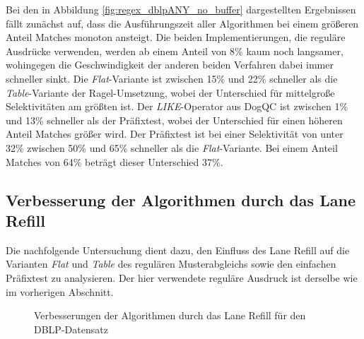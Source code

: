 Bei den in Abbildung \ref{fig:regex_dblpANY_no_buffer} dargestellten Ergebnissen fällt zunächst auf, dass die Ausführungszeit aller Algorithmen bei einem größeren Anteil Matches monoton ansteigt.
Die beiden Implementierungen, die reguläre Ausdrücke verwenden, werden ab einem Anteil von 8\% kaum noch langsamer, wohingegen die Geschwindigkeit der anderen beiden Verfahren dabei immer schneller sinkt.
Die \emph{Flat}-Variante ist zwischen 15\% und 22\% schneller als die \emph{Table}-Variante der Ragel-Umsetzung, wobei der Unterschied für mittelgroße Selektivitäten am größten ist.
Der \emph{LIKE}-Operator aus DogQC ist zwischen 1\% und 13\% schneller als der Präfixtest, wobei der Unterschied für einen höheren Anteil Matches größer wird.
Der Präfixtest ist bei einer Selektivität von unter 32\% zwischen 50\% und 65\% schneller als die \emph{Flat}-Variante.
Bei einem Anteil Matches von 64\% beträgt dieser Unterschied 37\%.

\subsection{Verbesserung der Algorithmen durch das Lane Refill}
\label{sec:regex_evaluation_beobachtung_2}

Die nachfolgende Untersuchung dient dazu, den Einfluss des Lane Refill auf die Varianten \emph{Flat} und \emph{Table} des regulären Musterabgleichs sowie den einfachen Präfixtest zu analysieren.
Der hier verwendete reguläre Ausdruck ist derselbe wie im vorherigen Abschnitt.

\begin{figure}[ht]
	\centering
	\caption{Verbesserungen der Algorithmen durch das Lane Refill für den DBLP-Datensatz}
	\label{fig:regex_dblpANY_buffer}
\end{figure}

